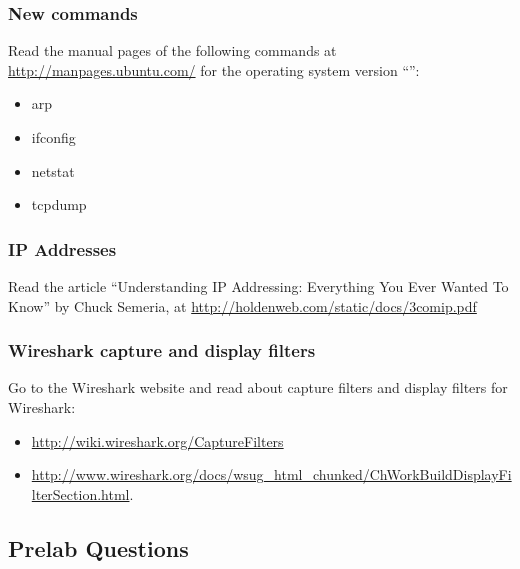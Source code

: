 
\subsubsection*{New commands}
Read the manual pages of the following commands at \url{http://manpages.ubuntu.com/} for the operating system version ``\osversion'':
\begin{itemize}
	\item arp
	\item ifconfig
	\item netstat
	\item tcpdump
\end{itemize}

\subsubsection*{IP Addresses}
Read the article ``Understanding IP Addressing: Everything You Ever Wanted To Know'' by Chuck Semeria, at \url{http://holdenweb.com/static/docs/3comip.pdf}

\subsubsection*{Wireshark capture and display filters}
Go to the Wireshark website and read about capture filters and display filters for Wireshark:
\begin{itemize} 
	\item \url{http://wiki.wireshark.org/CaptureFilters}
	\item \url{http://www.wireshark.org/docs/wsug_html_chunked/ChWorkBuildDisplayFilterSection.html}.
\end{itemize}

\newpage
\subsection*{Prelab Questions}

